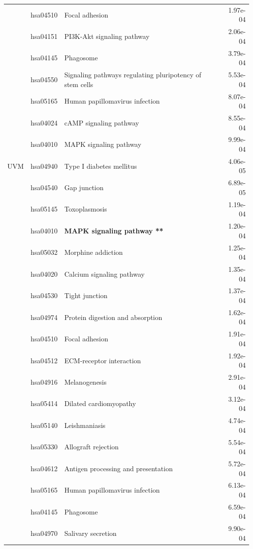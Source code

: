 \begin{longtable}{cllr}
 \rowcolor{\clrmatch}& hsa04510 & Focal adhesion & 1.97e-04 \\ 
 & hsa04151 & \textcolor{\clrnew}{PI3K-Akt signaling pathway} & 2.06e-04 \\ 
 & hsa04145 & \textcolor{\clrnew}{Phagosome} & 3.79e-04 \\ 
 & hsa04550 & \textcolor{\clrnew}{Signaling pathways regulating pluripotency of stem cells} & 5.53e-04 \\ 
 & hsa05165 & \textcolor{\clrnew}{Human papillomavirus infection} & 8.07e-04 \\ 
 & hsa04024 & \textcolor{\clrnew}{cAMP signaling pathway} & 8.55e-04 \\ 
 & hsa04010 & \textcolor{\clrnew}{MAPK signaling pathway} & 9.99e-04 \\ 
\midrule 
UVM & hsa04940 & \textcolor{\clrnew}{Type I diabetes mellitus} & 4.06e-05\\ %
 & hsa04540 & \textcolor{\clrnew}{Gap junction} & 6.89e-05 \\ 
 & hsa05145 & \textcolor{\clrnew}{Toxoplasmosis} & 1.19e-04 \\ 
 \rowcolor{\clrpath}& hsa04010 & \textbf{MAPK signaling pathway **} & 1.20e-04 \\ 
 & hsa05032 & \textcolor{\clrnew}{Morphine addiction} & 1.25e-04 \\ 
 & hsa04020 & \textcolor{\clrnew}{Calcium signaling pathway} & 1.35e-04 \\ 
 & hsa04530 & \textcolor{\clrnew}{Tight junction} & 1.37e-04 \\ 
 & hsa04974 & \textcolor{\clrnew}{Protein digestion and absorption} & 1.62e-04 \\ 
 & hsa04510 & \textcolor{\clrnew}{Focal adhesion} & 1.91e-04 \\ 
 & hsa04512 & \textcolor{\clrnew}{ECM-receptor interaction} & 1.92e-04 \\ 
 & hsa04916 & \textcolor{\clrnew}{Melanogenesis} & 2.91e-04 \\ 
 & hsa05414 & \textcolor{\clrnew}{Dilated cardiomyopathy} & 3.12e-04 \\ 
 & hsa05140 & \textcolor{\clrnew}{Leishmaniasis} & 4.74e-04 \\ 
 & hsa05330 & \textcolor{\clrnew}{Allograft rejection} & 5.54e-04 \\ 
 & hsa04612 & \textcolor{\clrnew}{Antigen processing and presentation} & 5.72e-04 \\ 
 & hsa05165 & \textcolor{\clrnew}{Human papillomavirus infection} & 6.13e-04 \\ 
 & hsa04145 & \textcolor{\clrnew}{Phagosome} & 6.59e-04 \\ 
 & hsa04970 & \textcolor{\clrnew}{Salivary secretion} & 9.90e-04 \\ 
\midrule 
\end{longtable} 